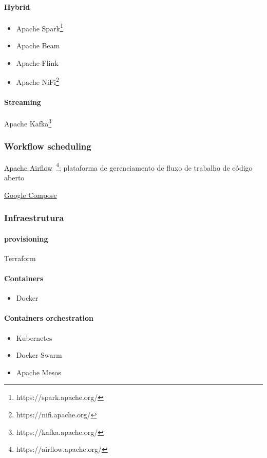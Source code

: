 \paragraph*{Hybrid}
\begin{itemize}	
	\item Apache Spark\footnote{https://spark.apache.org/}
	\item Apache Beam
	\item Apache Flink
	\item Apache NiFi\footnote{https://nifi.apache.org/}
\end{itemize}

\paragraph*{Streaming}
Apache Kafka\footnote{https://kafka.apache.org/}


\subsubsection*{Workflow scheduling}
\underline{Apache Airflow}~\footnote{https://airflow.apache.org/}: plataforma de gerenciamento de fluxo de trabalho de código aberto

\underline{Google Compose}


\subsubsection*{Infraestrutura}
\paragraph*{provisioning} 
Terraform

\paragraph*{Containers}
\begin{itemize}	
	\item Docker
\end{itemize}


\paragraph*{Containers orchestration}
\begin{itemize}	
	\item Kubernetes
	\item Docker Swarm
	\item Apache Mesos
\end{itemize}



